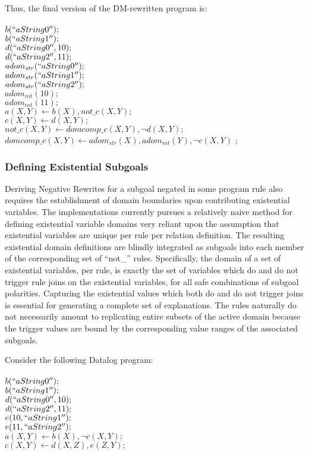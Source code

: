 Thus, the final version of the DM-rewritten program is:
\\ \\
$b( ``aString0'' ) ;$ \\
$b( ``aString1'' ) ; $\\
$d( ``aString0'', 10 ) ; $\\
$d( ``aString2'', 11 ) ; $\\
$adom_{str}( ``aString0'' ) ; $\\
$adom_{str}( ``aString1'' ) ; $\\
$adom_{str}( ``aString2'' ) ; $\\
$adom_{int}( 10 ) ; $\\
$adom_{int}( 11 ) ; $ \\
$a( X, Y ) \leftarrow  b( X ), not\_c( X, Y ) ; $\\
$c( X, Y ) \leftarrow d( X, Y ) ; $ \\
$not\_c( X, Y ) \leftarrow domcomp\_c( X, Y ),  \neg d( X, Y ) ; $ \\
$domcomp\_c(X,Y) \leftarrow adom_{str}(X), adom_{int}(Y), \neg c( X, Y )$ ;
\\

\subsubsection{Defining Existential Subgoals} \label{exi-subs}
Deriving Negative Rewrites for a subgoal negated in some program rule also requires the establishment of domain boundaries upon contributing existential variables. The implementations currently pursues a relatively naive method for defining existential variable domains very reliant upon the assumption that existential variables are unique per rule per relation definition. The resulting existential domain definitions are blindly integrated as subgoals into each member of the corresponding set of ``not\_'' rules. Specifically, the domain of a set of existential variables, per rule, is exactly the set of variables which do and do not trigger rule joins on the existential variables, for all safe combinations of subgoal polarities. Capturing the existential values which both do and do not trigger joins is essential for generating a complete set of explanations. The rules naturally do not necessarily amount to replicating entire subsets of the active domain because the trigger values are bound by the corresponding value ranges of the associated subgoals.

Consider the following Datalog program:
\\ \\
$b( ``aString0'' ) ;$ \\
$b( ``aString1'' ) ; $\\
$d( ``aString0'', 10 ) ; $\\
$d( ``aString2'', 11 ) ; $\\
$e( 10, ``aString1'' ) ; $\\
$e( 11, ``aString2'' ) ; $\\
$a( X, Y ) \leftarrow  b( X ), \neg c( X, Y ) ; $\\
$c( X, Y ) \leftarrow d( X, Z ), e( Z, Y ) ; $
\\

